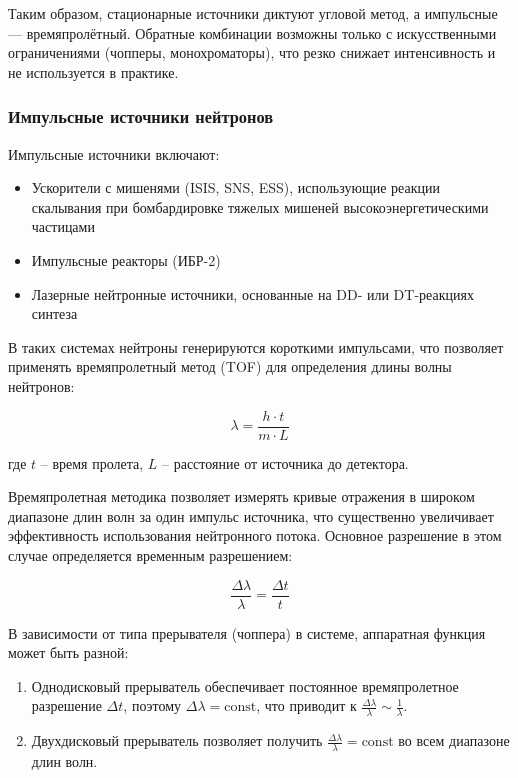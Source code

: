 \documentclass[a4paper]{article}
\begin{document}
Таким образом, стационарные источники диктуют угловой метод, а импульсные — времяпролётный. Обратные комбинации возможны только с искусственными ограничениями (чопперы, монохроматоры), что резко снижает интенсивность и не используется в практике.

\subsubsection{Импульсные источники нейтронов}
Импульсные источники включают:
\begin{itemize}
    \item Ускорители с мишенями (ISIS, SNS, ESS), использующие реакции скалывания при бомбардировке тяжелых мишеней высокоэнергетическими частицами 
    \item Импульсные реакторы (ИБР-2) 
    \item Лазерные нейтронные источники, основанные на DD- или DT-реакциях синтеза 
\end{itemize}

В таких системах нейтроны генерируются короткими импульсами, что позволяет применять времяпролетный метод (TOF) для определения длины волны нейтронов:

\begin{equation}
\lambda = \frac{h \cdot t}{m \cdot L}
\end{equation}

где $t$ -- время пролета, $L$ -- расстояние от источника до детектора.

Времяпролетная методика позволяет измерять кривые отражения в широком диапазоне длин волн за один импульс источника, что существенно увеличивает эффективность использования нейтронного потока. Основное разрешение в этом случае определяется временным разрешением:

\begin{equation}
\frac{\Delta\lambda}{\lambda} = \frac{\Delta t}{t}
\end{equation}

В зависимости от типа прерывателя (чоппера) в системе, аппаратная функция может быть разной:
\begin{enumerate}
    \item Однодисковый прерыватель обеспечивает постоянное времяпролетное разрешение $\Delta t$, поэтому $\Delta\lambda = \text{const}$, что приводит к $\frac{\Delta\lambda}{\lambda} \sim \frac{1}{\lambda}$. 
    \item Двухдисковый прерыватель позволяет получить $\frac{\Delta\lambda}{\lambda} = \text{const}$ во всем диапазоне длин волн. 
\end{enumerate}
\end{document}
